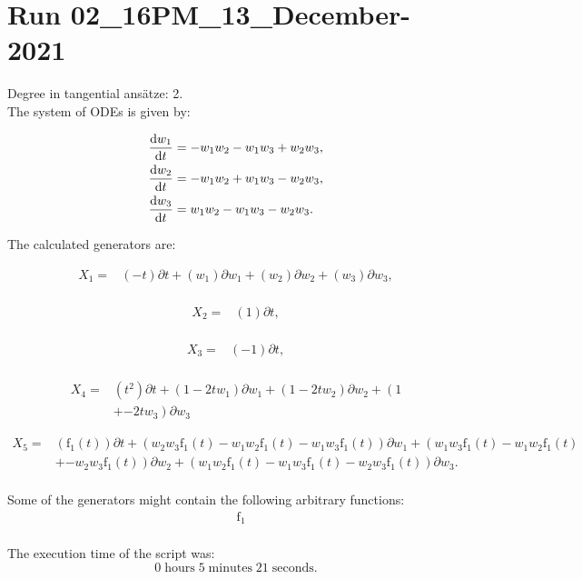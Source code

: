 \section*{Run 02\_16PM\_13\_December-2021}
Degree in tangential ansätze:	2.\\
The system of ODEs is given by:

\begin{align*}
\dv{w_{1}}{t}&=- w_{1} w_{2} - w_{1} w_{3} + w_{2} w_{3},\\
\dv{w_{2}}{t}&=- w_{1} w_{2} + w_{1} w_{3} - w_{2} w_{3},\\
\dv{w_{3}}{t}&=w_{1} w_{2} - w_{1} w_{3} - w_{2} w_{3}.\\
\end{align*}

\noindent The calculated generators are:

\begin{align*}
X_{1}=&\left(- t \right)\partial t+\left(w_{1} \right)\partial w_{1}+\left(w_{2} \right)\partial w_{2}+\left(w_{3} \right)\partial w_{3},\\
\end{align*}

\begin{align*}
X_{2}=&\left(1 \right)\partial t,\\
\end{align*}

\begin{align*}
X_{3}=&\left(-1 \right)\partial t,\\
\end{align*}

\begin{align*}
X_{4}=&\left(t^{2} \right)\partial t+\left(1- 2 t w_{1} \right)\partial w_{1}+\left(1- 2 t w_{2} \right)\partial w_{2}+\left(1\right.\\
&+\left.- 2 t w_{3} \right)\partial w_{3}
\end{align*}

\begin{align*}
X_{5}=&\left(\operatorname{f_{1}}{\left(t \right)} \right)\partial t+\left(w_{2} w_{3} \operatorname{f_{1}}{\left(t \right)}- w_{1} w_{2} \operatorname{f_{1}}{\left(t \right)}- w_{1} w_{3} \operatorname{f_{1}}{\left(t \right)} \right)\partial w_{1}+\left(w_{1} w_{3} \operatorname{f_{1}}{\left(t \right)}- w_{1} w_{2} \operatorname{f_{1}}{\left(t \right)}\right.\\
&+\left.- w_{2} w_{3} \operatorname{f_{1}}{\left(t \right)} \right)\partial w_{2}+\left(w_{1} w_{2} \operatorname{f_{1}}{\left(t \right)} - w_{1} w_{3} \operatorname{f_{1}}{\left(t \right)} - w_{2} w_{3} \operatorname{f_{1}}{\left(t \right)} \right)\partial w_{3}.\\
\end{align*}



\noindent Some of the generators might contain the following arbitrary functions:
\begin{align*}
&\operatorname{f_{1}}\\
\end{align*}

\noindent The execution time of the script was:
$$0\;\mathrm{hours}\;5\;\mathrm{minutes}\;21 \;\mathrm{seconds}.$$
